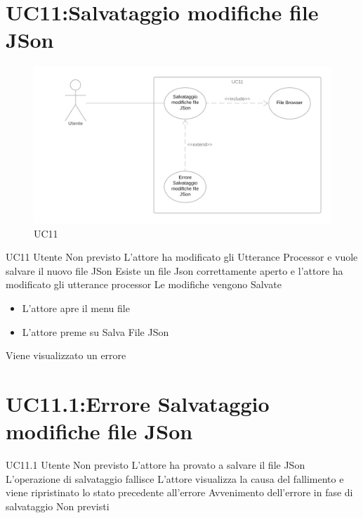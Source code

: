 \documentclass[../AnalisideiRequisiti.tex]{subfiles}
\begin{document}
\section{UC11:Salvataggio modifiche file JSon}
\begin{figure}[H]
	\caption{UC11}
	\centering
	\includegraphics[width=\textwidth]{../img/UC11.png}
\end{figure}
\UserCase
{UC11}
{Utente}
{Non previsto}
{L'attore ha modificato gli Utterance Processor e vuole salvare il nuovo file JSon}
{Esiste un file Json correttamente aperto  e l'attore ha modificato gli utterance processor  }
{Le modifiche vengono Salvate}
{
	\begin{itemize}
		\item{} L'attore apre il menu file 
		\item{} L'attore preme su Salva File JSon
	\end{itemize}
}
{Viene visualizzato un errore }
\section{UC11.1:Errore Salvataggio modifiche file JSon}
\UserCase
{UC11.1}
{Utente}
{Non previsto}
{L'attore ha provato a salvare il file JSon}
{L'operazione di salvataggio fallisce }
{L'attore visualizza la causa del fallimento e viene ripristinato lo stato precedente all'errore}
{Avvenimento dell'errore in fase di salvataggio}
{Non previsti}
\end{document}
